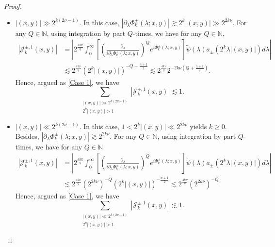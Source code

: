 \documentclass[a4paper,11pt, reqno]{amsart}
\numberwithin{equation}{section}
\theoremstyle{plain}
\theoremstyle{definition}
\theoremstyle{remark}
\begin{document}
\begin{proof}
\begin{itemize}
\begin{equation}
\end{equation}
\item $|(x,y)|\gg 2^{k(2\nu-1)}$. In this case, $|\partial_\lambda\Phi^\pm_k(\lambda;x,y)|\gtrsim 2^k|(x,y)|\gg 2^{2k\nu}$. For any $Q\in\mathbb{N}$, using integration by part $Q$-times, we have for any $Q\in\mathbb{N}$,
\begin{equation}
\begin{aligned}
|\mathcal{J}_k^{\pm,1}(x,y)|&=\left|2^\frac{4k\nu}{q}\int_0^\infty  \left[\left(\frac{\partial_\lambda}{i\partial_\lambda\Phi^\pm_k(\lambda;x,y)}\right)^Q e^{i\Phi^\pm_k(\lambda;x,y)}\right] \widetilde{\psi}(\lambda)a_{\pm}(2^k\lambda|(x,y)|)d\lambda\right|\\
&\lesssim 2^\frac{4k\nu}{q}\left(2^k|(x,y)|\right)^{-Q-\frac{n+1}{2}}\lesssim 2^\frac{4k\nu}{q}2^{-2k\nu(Q+\frac{n+1}{2})}.
\end{aligned}
\end{equation}
Hence, argued as \eqref{Case 1}, we have
\begin{equation}\label{Subcase 2}
\sum_{\substack{|(x,y)|\gg 2^{k(2\nu-1)}\\ 2^k|(x,y)|>1}}|\mathcal{J}_k^{\pm,1}(x,y)|\lesssim 1.
\end{equation}
\item $|(x,y)|\ll 2^{k(2\nu-1)}$. In this case, $1<2^k|(x,y)|\ll 2^{2k\nu}$ yields $k\geq 0$. Besides, $|\partial_\lambda\Phi^\pm_k(\lambda;x,y)|\gtrsim 2^{2k\nu}$. For any $Q\in\mathbb{N}$, using integration by part $Q$-times, we have for any $Q\in\mathbb{N}$
\begin{equation}
\begin{aligned}
|\mathcal{J}_k^{\pm,1}(x,y)|&=\left|2^\frac{4k\nu}{q}\int_0^\infty  \left[\left(\frac{\partial_\lambda}{i\partial_\lambda\Phi^\pm_k(\lambda;x,y)}\right)^Q e^{i\Phi^\pm_k(\lambda;x,y)}\right] \widetilde{\psi}(\lambda)a_{\pm}(2^k\lambda|(x,y)|)d\lambda\right|\\
&\lesssim 2^\frac{4k\nu}{q}\left(2^{2k\nu}\right)^{-Q}\left(2^k|(x,y)|\right)^{-\frac{n+1}{2}}\lesssim 2^\frac{4k\nu}{q}\left(2^{2k\nu}\right)^{-Q}.
\end{aligned}
\end{equation}
Hence, argued as \eqref{Case 1}, we have
\begin{equation}\label{Subcase 3}
\sum_{\substack{|(x,y)|\ll 2^{k(2\nu-1)}\\ 2^k|(x,y)|>1}}|\mathcal{J}_k^{\pm,1}(x,y)|\lesssim 1.
\end{equation}
\end{itemize}

\end{proof}
\end{document}
